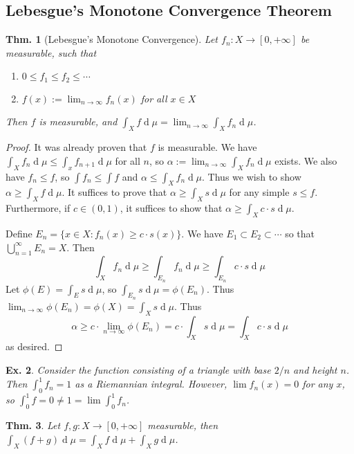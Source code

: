 \documentclass[12pt, a4paper]{book}
\renewcommand{\d}[1]{\ensuremath{\operatorname{d}\!{#1}}} %
\newtheorem{theorem}{Thm.}[section]
\newtheorem{example}[theorem]{Ex.}
\theoremstyle{nonumberplain}
\newtheorem{proof}{Proof}
\begin{document}
\subsection{Lebesgue's Monotone Convergence Theorem}
\begin{theorem}[Lebesgue's Monotone Convergence]
    Let $f_n:X\to[0,+\infty]$ be measurable, such that
    \begin{enumerate}[nolistsep, label=(\roman*)]
        \item $0\leq f_1\leq f_2\leq\cdots$
        \item $f(x):=\lim_{n\to\infty} f_n(x)$ for all $x\in X$
    \end{enumerate}
    Then $f$ is measurable, and $\int_X f\d{\mu}=\lim_{n\to\infty}\int_X f_n\d{\mu}$.
\end{theorem}
\begin{proof}
    It was already proven that $f$ is measurable.
    We have $\int_X f_n\d{\mu}\leq \int_x f_{n+1}\d{\mu}$ for all $n$, so $\alpha:=\lim_{n\to\infty}\int_X f_n \d{\mu}$ exists.
    We also have $f_n\leq f$, so $\int f_n\leq \int f$ and $\alpha\leq\int_X f_n\d{\mu}$.
    Thus we wish to show $\alpha\geq \int_Xf\d{\mu}$.
    It suffices to prove that $\alpha\geq\int_X s\d{\mu}$ for any simple $s\leq f$.
    Furthermore, if $c\in(0,1)$, it suffices to show that $\alpha\geq\int_X c\cdot s\d{\mu}$.

    Define $E_n=\{x\in X:f_n(x)\geq c\cdot s(x)\}$.
    We have $E_1\subset E_2\subset\cdots$ so that $\bigcup\limits_{n=1}^\infty E_n=X$.
    Then
    \begin{equation*}
        \int_X f_n\d{\mu} \geq \int_{E_n} f_n\d{\mu}\geq \int_{E_n} c\cdot s\d{\mu}
    \end{equation*}
    Let $\phi(E)=\int_E s\d{\mu}$, so $\int_{E_n}s\d{\mu}=\phi(E_n)$.
    Thus $\lim_{n\to\infty}\phi(E_n)=\phi(X)=\int_X s\d{\mu}$.
    Thus
    \begin{equation*}
        \alpha\geq c\cdot \lim_{n\to\infty}\phi(E_n)=c\cdot\int_X s\d{\mu}=\int_X c\cdot s\d{\mu}
    \end{equation*}
    as desired.
\end{proof}
\begin{example}
    Consider the function consisting of a triangle with base $2/n$ and height $n$.
    Then $\int_0^1 f_n=1$ as a Riemannian integral.
    However, $\lim f_n(x)=0$ for any $x$, so $\int_0^1 f=0\neq 1=\lim \int_0^1 f_n$.
\end{example}
\begin{theorem}
    Let $f,g:X\to[0,+\infty]$ measurable, then $\int_X(f+g)\d{\mu}=\int_X f\d{\mu}+\int_X g\d{\mu}$.
\end{theorem}
\end{document}
